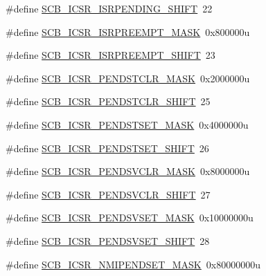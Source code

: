 \begin{DoxyCompactItemize}
\item 
\#define \hyperlink{group___s_c_b___register___masks_ga22f457e32a8d6a617ff90bdfb7b874de}{S\+C\+B\+\_\+\+I\+C\+S\+R\+\_\+\+I\+S\+R\+P\+E\+N\+D\+I\+N\+G\+\_\+\+S\+H\+I\+FT}~22
\item 
\#define \hyperlink{group___s_c_b___register___masks_ga5ecbf8248ffbd07923fc188497a5a931}{S\+C\+B\+\_\+\+I\+C\+S\+R\+\_\+\+I\+S\+R\+P\+R\+E\+E\+M\+P\+T\+\_\+\+M\+A\+SK}~0x800000u
\item 
\#define \hyperlink{group___s_c_b___register___masks_gafc9c373a4862603c06eaade5503d9fc7}{S\+C\+B\+\_\+\+I\+C\+S\+R\+\_\+\+I\+S\+R\+P\+R\+E\+E\+M\+P\+T\+\_\+\+S\+H\+I\+FT}~23
\item 
\#define \hyperlink{group___s_c_b___register___masks_ga7dc9d2d6061166d9cfa66904477acd2e}{S\+C\+B\+\_\+\+I\+C\+S\+R\+\_\+\+P\+E\+N\+D\+S\+T\+C\+L\+R\+\_\+\+M\+A\+SK}~0x2000000u
\item 
\#define \hyperlink{group___s_c_b___register___masks_ga4681662981a7a9ce4c39ba42e79bdf36}{S\+C\+B\+\_\+\+I\+C\+S\+R\+\_\+\+P\+E\+N\+D\+S\+T\+C\+L\+R\+\_\+\+S\+H\+I\+FT}~25
\item 
\#define \hyperlink{group___s_c_b___register___masks_gaec656bf7e4d2fdcacfe0ef3e16397a04}{S\+C\+B\+\_\+\+I\+C\+S\+R\+\_\+\+P\+E\+N\+D\+S\+T\+S\+E\+T\+\_\+\+M\+A\+SK}~0x4000000u
\item 
\#define \hyperlink{group___s_c_b___register___masks_ga048d1683c88c61f80f5c80173bf5e981}{S\+C\+B\+\_\+\+I\+C\+S\+R\+\_\+\+P\+E\+N\+D\+S\+T\+S\+E\+T\+\_\+\+S\+H\+I\+FT}~26
\item 
\#define \hyperlink{group___s_c_b___register___masks_ga12a45a6af09cbefd431d033d8411220e}{S\+C\+B\+\_\+\+I\+C\+S\+R\+\_\+\+P\+E\+N\+D\+S\+V\+C\+L\+R\+\_\+\+M\+A\+SK}~0x8000000u
\item 
\#define \hyperlink{group___s_c_b___register___masks_gad7a5894ad98606b443ab6f1b52f2bc36}{S\+C\+B\+\_\+\+I\+C\+S\+R\+\_\+\+P\+E\+N\+D\+S\+V\+C\+L\+R\+\_\+\+S\+H\+I\+FT}~27
\item 
\#define \hyperlink{group___s_c_b___register___masks_ga5ed59a5d03a7d25ef76aa9d92e25e4a5}{S\+C\+B\+\_\+\+I\+C\+S\+R\+\_\+\+P\+E\+N\+D\+S\+V\+S\+E\+T\+\_\+\+M\+A\+SK}~0x10000000u
\item 
\#define \hyperlink{group___s_c_b___register___masks_ga76cddcbf872958b00237c662309251d2}{S\+C\+B\+\_\+\+I\+C\+S\+R\+\_\+\+P\+E\+N\+D\+S\+V\+S\+E\+T\+\_\+\+S\+H\+I\+FT}~28
\item 
\#define \hyperlink{group___s_c_b___register___masks_gab2a6cb5708895a81ec8826b8fa546145}{S\+C\+B\+\_\+\+I\+C\+S\+R\+\_\+\+N\+M\+I\+P\+E\+N\+D\+S\+E\+T\+\_\+\+M\+A\+SK}~0x80000000u

\end{DoxyCompactItemize}
